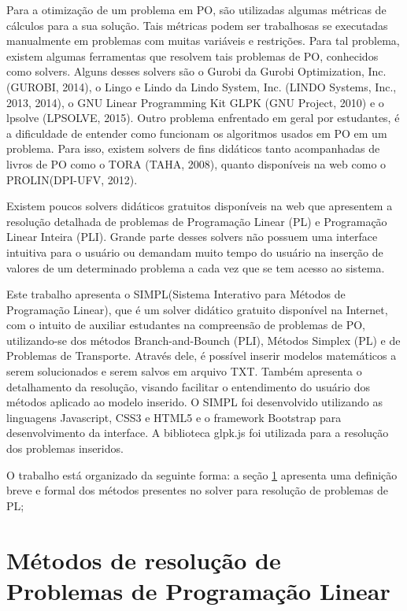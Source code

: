 \documentclass [11pt]{articleSBPO}
\begin{document}
Para a otimização de um problema em PO, são utilizadas algumas métricas de cálculos para a sua solução. Tais métricas podem ser trabalhosas se executadas manualmente em problemas com muitas variáveis e restrições. Para tal problema, existem algumas ferramentas que resolvem tais problemas de PO, conhecidos como solvers. Alguns desses solvers são o Gurobi da Gurobi Optimization, Inc. (GUROBI, 2014), o Lingo e Lindo da Lindo System, Inc. (LINDO Systems, Inc., 2013, 2014), o GNU Linear Programming Kit GLPK (GNU Project, 2010) e o lpsolve (LPSOLVE, 2015). Outro problema enfrentado em geral por estudantes, é a dificuldade de entender como funcionam os algoritmos usados em PO em um problema. Para isso, existem solvers de fins didáticos tanto acompanhadas de livros de PO como o TORA (TAHA, 2008), quanto disponíveis na web como o PROLIN(DPI-UFV, 2012). 

Existem poucos solvers didáticos gratuitos disponíveis na web que apresentem a resolução detalhada de problemas de Programação Linear (PL) e Programação Linear Inteira (PLI). Grande parte desses solvers não possuem uma interface intuitiva para o usuário ou demandam muito tempo do usuário na inserção de valores de um determinado problema a cada vez que se tem acesso ao sistema.

Este trabalho apresenta o SIMPL(Sistema Interativo para Métodos de Programação Linear), que é um solver didático gratuito disponível na Internet, com o intuito de auxiliar estudantes na compreensão de problemas de PO, utilizando-se dos métodos Branch-and-Bounch (PLI), Métodos Simplex (PL) e de Problemas de Transporte. Através dele, é possível inserir modelos matemáticos a serem solucionados e serem salvos em arquivo TXT. Também apresenta o detalhamento da resolução, visando facilitar o entendimento do usuário dos métodos aplicado ao modelo inserido. O SIMPL foi desenvolvido utilizando as linguagens Javascript, CSS3 e HTML5 e o framework Bootstrap para desenvolvimento da interface. A biblioteca glpk.js foi utilizada para a resolução dos problemas inseridos.

O trabalho está organizado da seguinte forma: a seção \ref{sec:metodos} apresenta uma definição breve e formal dos métodos presentes no solver para resolução de problemas de PL;


\section{Métodos de resolução de Problemas de Programação Linear}
\label{sec:metodos}
\end{document}
